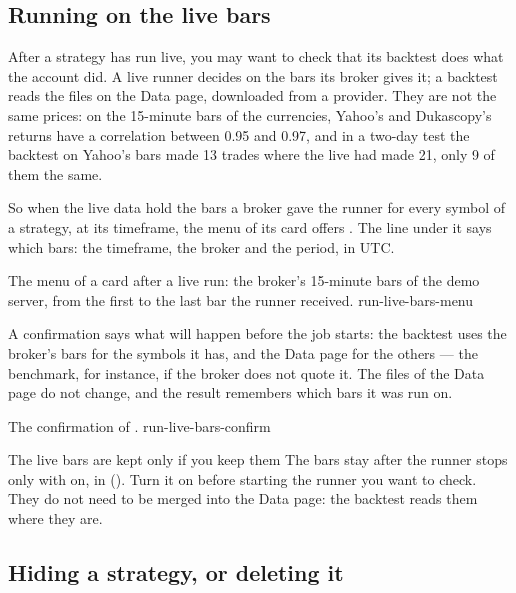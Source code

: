 \subsection{Running on the live bars}\label{sez:run-live-bars}

After a strategy has run live, you may want to check that its backtest does
what the account did. A live runner decides on the bars its broker gives it;
a backtest reads the files on the Data page, downloaded from a provider.
They are not the same prices: on the 15-minute bars of the currencies,
Yahoo's and Dukascopy's returns have a correlation between \num{0.95} and
\num{0.97}, and in a two-day test the backtest on Yahoo's bars made \num{13}
trades where the live had made \num{21}, only \num{9} of them the same.

So when the live data hold the bars a broker gave the runner for every
symbol of a strategy, at its timeframe, the menu of its card offers
. The line under it says which bars: the
timeframe, the broker and the period, in UTC.

  {The menu of a card after a live run: the broker's 15-minute bars of the
   demo server, from the first to the last bar the runner received.}
  {run-live-bars-menu}

\noindent
A confirmation says what will happen before the job starts: the backtest
uses the broker's bars for the symbols it has, and the Data page for the
others --- the benchmark, for instance, if the broker does not quote it. The
files of the Data page do not change, and the result remembers which bars it
was run on.

  {The confirmation of .}
  {run-live-bars-confirm}

\begin{nota}{The live bars are kept only if you keep them}
The bars stay after the runner stops only with  on, in 
(). Turn it on before starting the runner you want to
check. They do not need to be merged into the Data page: the backtest reads
them where they are.
\end{nota}

\subsection{Hiding a strategy, or deleting it}\label{sez:run-hide}

